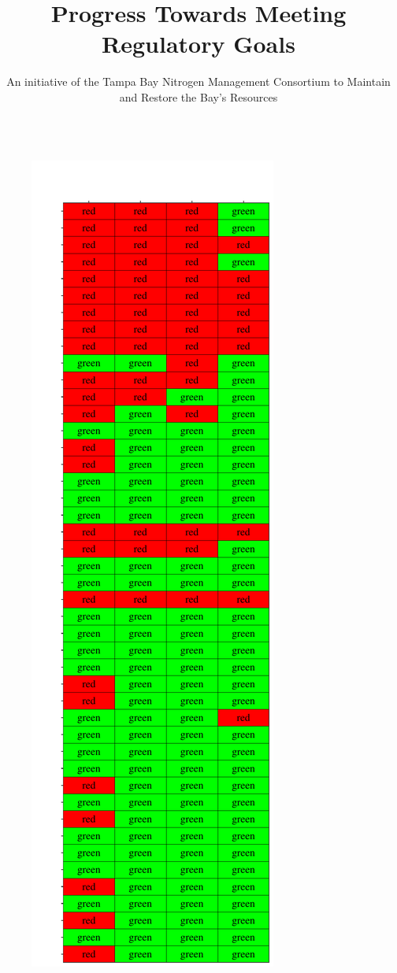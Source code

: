 \documentclass[final,t]{beamer}\usepackage[]{graphicx}\usepackage[]{color}
\title{\Large Progress Towards Meeting Regulatory Goals}
\author{\normalsize An initiative of the Tampa Bay Nitrogen Management Consortium to Maintain\\ and Restore the Bay's Resources}
\begin{document}
\begin{frame}

\vspace{-0.4cm} %
\begin{columns}[t]

\begin{column}{.32\linewidth}

\vspace{-0.1in}


\begin{figure}
\centerline{\includegraphics[trim = 0cm 0cm 0cm 0cm, width=1.1\linewidth]{figure/chlmat.pdf}}

\end{figure}
\end{column}
\end{columns}
\end{frame}
\end{document}
